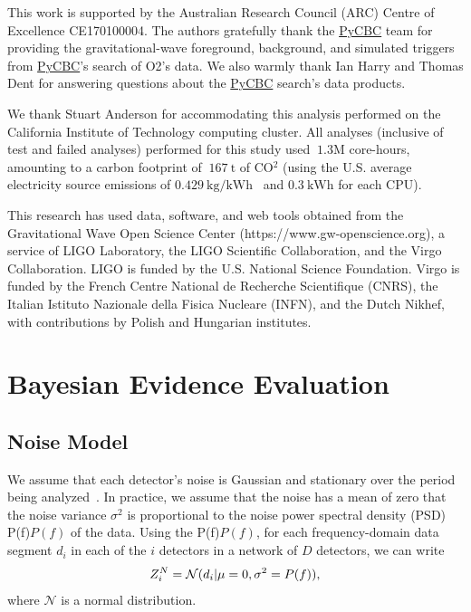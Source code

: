 \documentclass[%
 nofootinbib,
 amsmath,amssymb,
 aps,
 twocolumn,
 superscriptaddress
]{revtex4-2}
\newcommand{\pycbc}{{\sc \href{https://pycbc.org/}{{PyCBC}}}\xspace}
\newcommand{\mathcmd}[1]{{\sc \relax\ifmmode#1\else $#1$\fi}\xspace}
\newcommand{\psd}{\mathcmd{P(f)}}
\begin{document}

\begin{acknowledgments}
This work is supported by the Australian Research Council (ARC) Centre of Excellence CE170100004.
The authors gratefully thank the \pycbc team for providing the gravitational-wave foreground, background, and simulated triggers from \pycbc's search of O2's data. We also warmly thank Ian Harry and Thomas Dent for answering questions about the \pycbc search's data products.  

We thank Stuart Anderson for accommodating this analysis performed on the California Institute of Technology computing cluster. All analyses (inclusive of test and failed analyses) performed for this study used $~1.3\mathrm{M}$ core-hours, amounting to a carbon footprint of $~167\ \mathrm{t}$ of CO$^2$ (using the U.S. average electricity source emissions of $0.429\ \text{kg/kWh}$~\cite{greenhouse} and $0.3\ \text{kWh}$ for each CPU).

This research has used data, software, and web tools obtained from the Gravitational Wave Open Science Center (https://www.gw-openscience.org), a service of LIGO Laboratory, the LIGO Scientific Collaboration, and the Virgo Collaboration. LIGO is funded by the U.S. National Science Foundation. Virgo is funded by the French Centre National de Recherche Scientifique (CNRS), the Italian Istituto Nazionale della Fisica Nucleare (INFN), and the Dutch Nikhef, with contributions by Polish and Hungarian institutes.

\end{acknowledgments}

\appendix



\section{Bayesian Evidence Evaluation}\label{sec:bayesianEvidEval}

\subsection{Noise Model}
We assume that each detector's noise is Gaussian and stationary over the period being analyzed~\cite{ligo_psd}. In practice, we assume that the noise has a mean of zero that the noise variance $\sigma^2$ is proportional to the noise power spectral density (PSD) \psd of the data. Using the \psd, for each frequency-domain data segment $d_i$ in each of the $i$ detectors in a network of $D$ detectors, we can write 
\begin{equation}
\label{eq:zn}
Z^N_i = \mathcal{N}(d_i|\mu=0,\sigma^2=\psd),
\end{equation}
where $\mathcal{N}$ is a normal distribution. 
\end{document}
